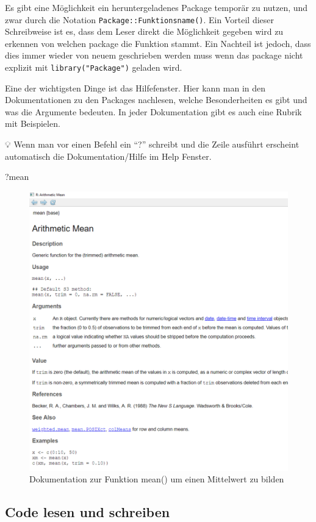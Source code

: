 \documentclass[
]{article}
\newenvironment{Shaded}{\begin{snugshade}}{\end{snugshade}}
\newcommand{\NormalTok}[1]{#1}
\begin{document}
Es gibt eine Möglichkeit ein heruntergeladenes Package temporär zu nutzen, und zwar durch die Notation \texttt{Package::Funktionsname()}. Ein Vorteil dieser Schreibweise ist es, dass dem Leser direkt die Möglichkeit gegeben wird zu erkennen von welchen package die Funktion stammt. Ein Nachteil ist jedoch, dass dies immer wieder von neuem geschrieben werden muss wenn das package nicht explizit mit \texttt{library("Package")} geladen wird.

Eine der wichtigsten Dinge ist das Hilfefenster. Hier kann man in den Dokumentationen zu den Packages nachlesen, welche Besonderheiten es gibt und was die Argumente bedeuten. In jeder Dokumentation gibt es auch eine Rubrik mit Beispielen.

💡 Wenn man vor einen Befehl ein ``?'' schreibt und die Zeile ausführt erscheint automatisch die Dokumentation/Hilfe im Help Fenster.

\begin{Shaded}
\begin{Highlighting}[]
\NormalTok{?mean}
\end{Highlighting}
\end{Shaded}

\begin{figure}

{\centering \includegraphics[width=0.5\linewidth]{images/012} 

}

\caption{Dokumentation zur Funktion mean() um einen Mittelwert zu bilden}\label{fig:unnamed-chunk-18}
\end{figure}

\hypertarget{code-lesen-und-schreiben}{%
\subsection{Code lesen und schreiben}\label{code-lesen-und-schreiben}}
\end{document}
